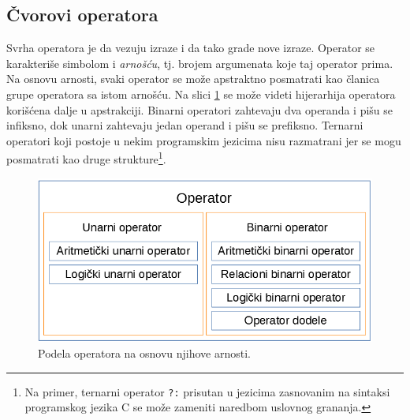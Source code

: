 \subsection{Čvorovi operatora}
\label{subsec:MyASTOperatorNodes}

Svrha operatora je da vezuju izraze i da tako grade nove izraze. Operator se karakteriše simbolom i \emph{arnošću}, tj. brojem argumenata koje taj operator prima. Na osnovu arnosti, svaki operator se može apstraktno posmatrati kao članica grupe operatora sa istom arnošću. Na slici \ref{fig:OperatorNodes} se može videti hijerarhija operatora korišćena dalje u apstrakciji. Binarni operatori zahtevaju dva operanda i pišu se infiksno, dok unarni zahtevaju jedan operand i pišu se prefiksno. Ternarni operatori koji postoje u nekim programskim jezicima nisu razmatrani jer se mogu posmatrati kao druge strukture\footnote{Na primer, ternarni operator \texttt{?:} prisutan u jezicima zasnovanim na sintaksi programskog jezika C se može zameniti naredbom uslovnog grananja.}. 

\begin{figure}[h!]
\centering
\includegraphics[scale=0.5]{images/operator_nodes.png}
\caption{Podela operatora na osnovu njihove arnosti.}
\label{fig:OperatorNodes}
\end{figure}

